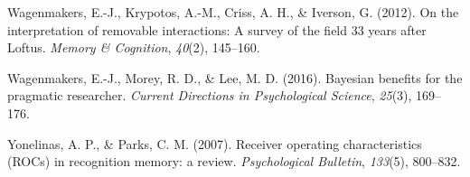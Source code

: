 \documentclass[
  english,
  ,man,floatsintext]{apa6}
\begin{document}
\leavevmode\hypertarget{ref-WagenmakersEtAl2012}{}%
Wagenmakers, E.-J., Krypotos, A.-M., Criss, A. H., \& Iverson, G. (2012). On the interpretation of removable interactions: A survey of the field 33 years after Loftus. \emph{Memory \& Cognition}, \emph{40}(2), 145--160.

\leavevmode\hypertarget{ref-WagenmakersEtAl2016}{}%
Wagenmakers, E.-J., Morey, R. D., \& Lee, M. D. (2016). Bayesian benefits for the pragmatic researcher. \emph{Current Directions in Psychological Science}, \emph{25}(3), 169--176.

\leavevmode\hypertarget{ref-YonelinasAndParks2007}{}%
Yonelinas, A. P., \& Parks, C. M. (2007). Receiver operating characteristics (ROCs) in recognition memory: a review. \emph{Psychological Bulletin}, \emph{133}(5), 800--832.
\end{document}
